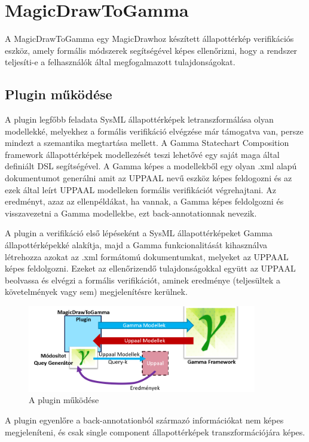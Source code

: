 \chapter{MagicDrawToGamma}

A MagicDrawToGamma egy MagicDrawhoz készített állapottérkép verifikációs eszköz, amely formális módszerek segítségével képes ellenőrizni, hogy a rendszer teljesíti-e a felhasználók által megfogalmazott tulajdonságokat.

\section{Plugin működése}

A plugin legfőbb feladata SysML állapottérképek letranszformálása olyan modellekké, melyekhez a formális verifikáció elvégzése már támogatva van, persze mindezt a szemantika megtartása mellett. A Gamma Statechart Composition framework állapottérképek modellezését teszi lehetővé egy saját maga által definiált DSL segítségével. A Gamma képes a modellekből egy olyan .xml alapú dokumentumot generálni amit az UPPAAL nevű eszköz képes feldogozni és az ezek által leírt UPPAAL modelleken formális verifikációt végrehajtani. Az eredményt, azaz az ellenpéldákat, ha vannak, a Gamma képes feldolgozni és visszavezetni a Gamma modellekbe, ezt back-annotationnak nevezik.

A plugin a verifikáció első lépéseként a SysML állapottérképeket Gamma állapottérképekké alakítja, majd a Gamma funkcionalitását kihasználva létrehozza azokat az .xml formátomú dokumentumkat, melyeket az UPPAAL képes feldolgozni. Ezeket az ellenőrizendő tulajdonságokkal együtt az UPPAAL beolvassa és elvégzi a formális verifikációt, aminek eredménye (teljesültek a követelmények vagy sem) megjelenítésre kerülnek.

\begin{figure}[!ht]
	\centering
	\includegraphics[width=100mm, keepaspectratio]{figures/concept.png}
	\caption{A plugin működése}
	\label{fig:concept}
\end{figure}

A plugin egyenlőre a back-annotationból származó információkat nem képes megjeleníteni, és csak single component állapottérképek transzformációjára képes.







